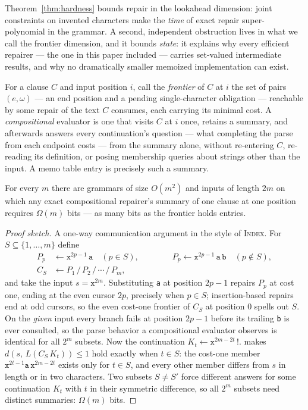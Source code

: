 \documentclass[manuscript]{acmart}
\newcommand{\cd}[1]{\texttt{#1}}
\begin{document}
Theorem~\ref{thm:hardness} bounds repair in the lookahead dimension: joint constraints on invented characters make the \emph{time} of exact repair super-polynomial in the grammar. A second, independent obstruction lives in what we call the frontier dimension, and it bounds \emph{state}: it explains why every efficient repairer --- the one in this paper included --- carries set-valued intermediate results, and why no dramatically smaller memoized implementation can exist.

For a clause $C$ and input position $i$, call the \emph{frontier} of $C$ at $i$ the set of pairs $(e, \omega)$ --- an end position and a pending single-character obligation --- reachable by some repair of the text $C$ consumes, each carrying its minimal cost. A \emph{compositional} evaluator is one that visits $C$ at $i$ once, retains a summary, and afterwards answers every continuation's question --- what completing the parse from each endpoint costs --- from the summary alone, without re-entering $C$, re-reading its definition, or posing membership queries about strings other than the input. A memo table entry is precisely such a summary.

\begin{theorem}
\label{thm:frontier}
For every $m$ there are grammars of size $O(m^2)$ and inputs of length $2m$ on which any exact compositional repairer's summary of one clause at one position requires $\Omega(m)$ bits --- as many bits as the frontier holds entries.
\end{theorem}

\begin{proof}[Proof sketch]
A one-way communication argument in the style of \textsc{Index}. For $S \subseteq \{1, \ldots, m\}$ define
\begin{align*}
P_p &\leftarrow \cd{x}^{2p-1}\,\cd{a} \quad (p \in S), \qquad\qquad P_p \leftarrow \cd{x}^{2p-1}\,\cd{a}\,\cd{b} \quad (p \notin S),\\
C_S &\leftarrow P_1 \,/\, P_2 \,/\, \cdots \,/\, P_m,
\end{align*}
and take the input $s = \cd{x}^{2m}$. Substituting \cd{a} at position $2p-1$ repairs $P_p$ at cost one, ending at the even cursor $2p$, precisely when $p \in S$; insertion-based repairs end at odd cursors, so the even cost-one frontier of $C_S$ at position $0$ spells out $S$. On the \emph{given} input every branch fails at position $2p-1$ before its trailing \cd{b} is ever consulted, so the parse behavior a compositional evaluator observes is identical for all $2^m$ subsets. Now the continuation $K_t \leftarrow \cd{x}^{2m-2t}\,\mathop{!}\cd{.}$ makes $d(s,\, L(C_S\, K_t)) \le 1$ hold exactly when $t \in S$: the cost-one member $\cd{x}^{2t-1}\cd{a}\,\cd{x}^{2m-2t}$ exists only for $t \in S$, and every other member differs from $s$ in length or in two characters. Two subsets $S \ne S'$ force different answers for some continuation $K_t$ with $t$ in their symmetric difference, so all $2^m$ subsets need distinct summaries: $\Omega(m)$ bits.
\end{proof}
\end{document}
